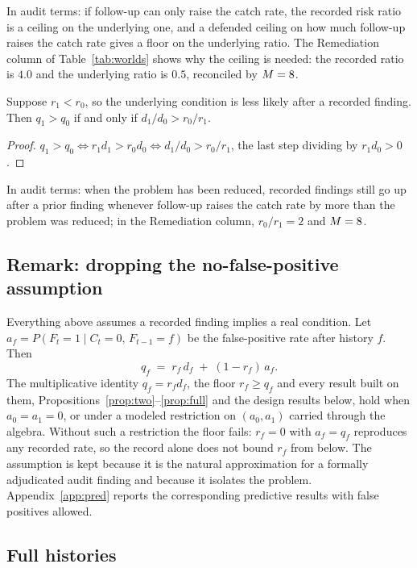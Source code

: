 In audit terms: if follow-up can only raise the catch rate, the recorded risk
ratio is a ceiling on the underlying one, and a defended ceiling on how much
follow-up raises the catch rate gives a floor on the underlying ratio. The
Remediation column of Table~\ref{tab:worlds} shows why the ceiling is needed:
the recorded ratio is $4.0$ and the underlying ratio is $0.5$, reconciled by
$M = 8{}$.

\begin{proposition}\label{prop:remed}
Suppose $r_1 < r_0$, so the underlying condition is less likely after a
recorded finding. Then $q_1 > q_0$ if and only if $d_1/d_0 > r_0/r_1$.
\end{proposition}

\begin{proof}
$q_1 > q_0 \iff r_1 d_1 > r_0 d_0 \iff d_1/d_0 > r_0/r_1$, the last step
dividing by $r_1 d_0 > 0$.
\end{proof}

In audit terms: when the problem has been reduced, recorded findings still go
up after a prior finding whenever follow-up raises the catch rate by more than
the problem was reduced; in the Remediation column, $r_0/r_1 = 2$ and $M =
8{}$.

\subsection{Remark: dropping the no-false-positive assumption}

Everything above assumes a recorded finding implies a real condition. Let
$a_f = P(F_t = 1 \mid C_t = 0,\, F_{t-1} = f)$ be the false-positive rate after
history $f$. Then
%
\[
  q_f \;=\; r_f\, d_f \;+\; (1 - r_f)\, a_f .
\]
%
The multiplicative identity $q_f = r_f d_f$, the floor $r_f \ge q_f$ and every
result built on them, Propositions~\ref{prop:two}--\ref{prop:full} and the
design results below, hold when $a_0 = a_1 = 0$, or under a modeled
restriction on $(a_0, a_1)$ carried through the algebra. Without such a
restriction the floor fails: $r_f = 0$ with $a_f = q_f$ reproduces any
recorded rate, so the record alone does not bound $r_f$ from below. The
assumption is kept because it is the natural approximation for a formally
adjudicated audit finding and because it isolates the problem.
Appendix~\ref{app:pred} reports the corresponding predictive results with
false positives allowed.

\subsection{Full histories}

